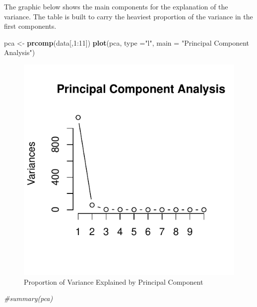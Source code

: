 \documentclass[]{article}
\newenvironment{Shaded}{\begin{snugshade}}{\end{snugshade}}
\newcommand{\KeywordTok}[1]{\textcolor[rgb]{0.13,0.29,0.53}{\textbf{{#1}}}}
\newcommand{\DataTypeTok}[1]{\textcolor[rgb]{0.13,0.29,0.53}{{#1}}}
\newcommand{\DecValTok}[1]{\textcolor[rgb]{0.00,0.00,0.81}{{#1}}}
\newcommand{\StringTok}[1]{\textcolor[rgb]{0.31,0.60,0.02}{{#1}}}
\newcommand{\CommentTok}[1]{\textcolor[rgb]{0.56,0.35,0.01}{\textit{{#1}}}}
\newcommand{\NormalTok}[1]{{#1}}
\begin{document}
The graphic below shows the main components for the explanation of the
variance. The table is built to carry the heaviest proportion of the
variance in the first components.

\begin{Shaded}
\begin{Highlighting}[]
\NormalTok{pca <-}\StringTok{ }\KeywordTok{prcomp}\NormalTok{(data[,}\DecValTok{1}\NormalTok{:}\DecValTok{11}\NormalTok{])}
\KeywordTok{plot}\NormalTok{(pca, }\DataTypeTok{type =}\StringTok{"l"}\NormalTok{, }\DataTypeTok{main =} \StringTok{"Principal Component Analysis"}\NormalTok{)}
\end{Highlighting}
\end{Shaded}

\begin{figure}[htbp]
\centering
\includegraphics{Project_files/figure-latex/unnamed-chunk-11-1.pdf}
\caption{Proportion of Variance Explained by Principal Component}
\end{figure}

\begin{Shaded}
\begin{Highlighting}[]
\CommentTok{#summary(pca)}
\end{Highlighting}
\end{Shaded}
\end{document}
